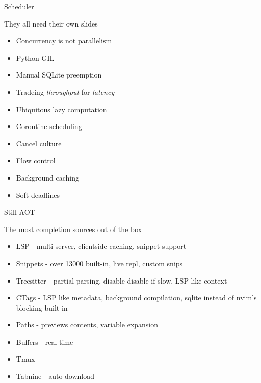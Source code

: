 \documentclass{beamer}
\begin{document}
\begin{frame}{Scheduler}

	They all need their own slides

	\begin{itemize}

		\item Concurrency is not parallelism

		\item Python GIL

		\item Manual SQLite preemption

		\item Tradeing \textit{throughput} for \textit{latency}

		\item Ubiquitous lazy computation

		\item Coroutine scheduling

		\item Cancel culture

		\item Flow control

		\item Background caching

		\item Soft deadlines

	\end{itemize}

\end{frame}


\begin{frame}{Still AOT}

	The most completion sources out of the box

	\begin{itemize}

		\item LSP - multi-server, clientside caching, snippet support

		\item Snippets - over 13000 built-in, live repl, custom snips

		\item Treesitter - partial parsing, disable disable if slow, LSP like context

		\item CTags - LSP like metadata, background compilation, sqlite instead of nvim's blocking built-in

		\item Paths - previews contents, variable expansion

		\item Buffers - real time

		\item Tmux

		\item Tabnine - auto download

	\end{itemize}

\end{frame}
\end{document}
